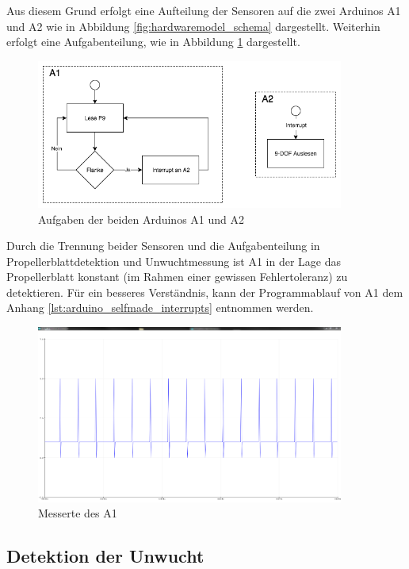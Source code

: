 Aus diesem Grund erfolgt eine Aufteilung der Sensoren auf die zwei Arduinos \ac{A1} und \ac{A2} wie in Abbildung \ref{fig:hardwaremodel_schema} dargestellt. 
Weiterhin erfolgt eine Aufgabenteilung, wie in Abbildung \ref{fig:aufgaben-arduinos} dargestellt.
\begin{figure}[H]
	\centering
	\includegraphics[width=0.9\textwidth]{images/chapter/03/aufgaben-arduinos.png}
	\caption{Aufgaben der beiden Arduinos \ac{A1} und \ac{A2}}
	\label{fig:aufgaben-arduinos}
\end{figure}
Durch die Trennung beider Sensoren und die Aufgabenteilung in Propellerblattdetektion und Unwuchtmessung ist \ac{A1} in der Lage das Propellerblatt konstant (im Rahmen einer gewissen Fehlertoleranz) zu detektieren.
Für ein besseres Verständnis, kann der Programmablauf von \ac{A1} dem Anhang \ref{lst:arduino_selfmade_interrupts} entnommen werden.
\begin{figure}[H]
	\centering
	\includegraphics[width=0.9\textwidth]{images/chapter/03/self_made_interrupt_a1.png}
	\caption{Messerte des \ac{A1}}
	\label{fig:self_made_interrupt_a1}
\end{figure}

\subsection{Detektion der Unwucht}
\label{subsec:detektion_der_unwucht}

